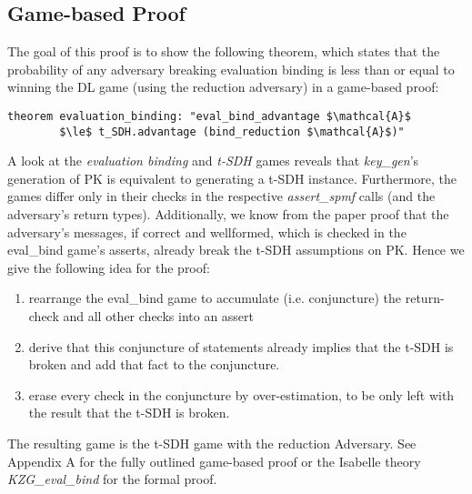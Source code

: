 \subsection{Game-based Proof}
\label{security:binding:gamebased}
The goal of this proof is to show the following theorem, which states that the probability of any adversary breaking evaluation binding is less than or equal to winning the DL game (using the reduction adversary) in a game-based proof:
\begin{lstlisting}[language=isabelle]
    theorem evaluation_binding: "eval_bind_advantage $\mathcal{A}$ 
        $\le$ t_SDH.advantage (bind_reduction $\mathcal{A}$)"
\end{lstlisting}

A look at the \textit{evaluation binding} and \textit{t-SDH} games reveals that \textit{key\_gen}'s generation of PK is equivalent to generating a t-SDH instance. Furthermore, the games differ only in their checks in the respective \textit{assert\_spmf} calls (and the adversary's return types).  
Additionally, we know from the paper proof that the adversary's messages, if correct and wellformed, which is checked in the eval\_bind game's asserts, already break the t-SDH assumptions on PK. 
Hence we give the following idea for the proof:
\begin{enumerate}
    \item rearrange the eval\_bind game to accumulate (i.e. conjuncture) the return-check and all other checks into an assert
    \item derive that this conjuncture of statements already implies that the t-SDH is broken and add that fact to the conjuncture.
    \item erase every check in the conjuncture by over-estimation, to be only left with the result that the t-SDH is broken.
\end{enumerate}
The resulting game is the t-SDH game with the reduction Adversary. 
See Appendix A for the fully outlined game-based proof or the Isabelle theory \textit{KZG\_eval\_bind} for the formal proof.

